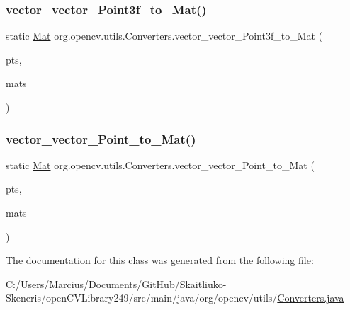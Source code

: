 \subsubsection{\texorpdfstring{vector\+\_\+vector\+\_\+\+Point3f\+\_\+to\+\_\+\+Mat()}{vector\_vector\_Point3f\_to\_Mat()}}
{\footnotesize\ttfamily static \mbox{\hyperlink{classorg_1_1opencv_1_1core_1_1_mat}{Mat}} org.\+opencv.\+utils.\+Converters.\+vector\+\_\+vector\+\_\+\+Point3f\+\_\+to\+\_\+\+Mat (\begin{DoxyParamCaption}\item[{List$<$ \mbox{\hyperlink{classorg_1_1opencv_1_1core_1_1_mat_of_point3f}{Mat\+Of\+Point3f}} $>$}]{pts,  }\item[{List$<$ \mbox{\hyperlink{classorg_1_1opencv_1_1core_1_1_mat}{Mat}} $>$}]{mats }\end{DoxyParamCaption})\hspace{0.3cm}{\ttfamily [static]}}

\mbox{\label{classorg_1_1opencv_1_1utils_1_1_converters_a6fa05e084aae69774eae2a6fb0dc07c1}} 
\subsubsection{\texorpdfstring{vector\+\_\+vector\+\_\+\+Point\+\_\+to\+\_\+\+Mat()}{vector\_vector\_Point\_to\_Mat()}}
{\footnotesize\ttfamily static \mbox{\hyperlink{classorg_1_1opencv_1_1core_1_1_mat}{Mat}} org.\+opencv.\+utils.\+Converters.\+vector\+\_\+vector\+\_\+\+Point\+\_\+to\+\_\+\+Mat (\begin{DoxyParamCaption}\item[{List$<$ \mbox{\hyperlink{classorg_1_1opencv_1_1core_1_1_mat_of_point}{Mat\+Of\+Point}} $>$}]{pts,  }\item[{List$<$ \mbox{\hyperlink{classorg_1_1opencv_1_1core_1_1_mat}{Mat}} $>$}]{mats }\end{DoxyParamCaption})\hspace{0.3cm}{\ttfamily [static]}}



The documentation for this class was generated from the following file\+:\begin{DoxyCompactItemize}
\item 
C\+:/\+Users/\+Marcius/\+Documents/\+Git\+Hub/\+Skaitliuko-\/\+Skeneris/open\+C\+V\+Library249/src/main/java/org/opencv/utils/\mbox{\hyperlink{_converters_8java}{Converters.\+java}}\end{DoxyCompactItemize}
